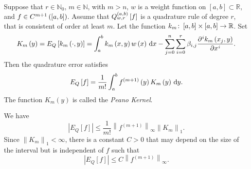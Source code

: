 \begin{frame}
    \begin{theorem}
        Suppose that $r\in\mathbb{N}_{0}$, $m\in\mathbb{N}$, with $m>n$,
        $w$ is a weight function on $\left[a,b\right]\subset\mathbb{R}$, and
        $f\in C^{m+1}\left(\left[a,b\right]\right)$.
        Assume that
        \begin{math}
            Q^{\left(a,b\right)}_{w,r}
            \left[f\right]
        \end{math}
        is a quadrature rule of degree $r$,
        that is consistent of order at least $m$.
        Let the function
        \begin{math}
            k_{m}\colon\left[a,b\right]\times\left[a,b\right]\to\mathbb{R}
        \end{math}.
        Set
        \begin{equation*}
            K_{m}\left(y\right)=
            E_{Q}\left[k_{m}\left(\cdot, y\right)\right]=
            \int_{a}^{b}
            k_{m}\left(x,y\right)w\left(x\right)\dl x-
            \sum_{j=0}^{n}
            \sum_{i=0}^{r}
            \beta_{i,j}
            \diffp[i]{k_{m}\left(x_{j},y\right)}{x}.
        \end{equation*}
        Then the quadrature error satisfies
        \begin{equation*}
            E_{Q}\left[f\right]=
            \dfrac{1}{m!}
            \int_{a}^{b}
            f^{\left(m+1\right)}\left(y\right)
            K_{m}\left(y\right)
            \dl y.
        \end{equation*}
        The function $K_{m}\left(y\right)$ is called the \emph{Peano Kernel}.
    \end{theorem}

    \begin{theorem}
        We have
        \begin{equation*}
            \left|
            E_{Q}
            \left[f\right]
            \right|\leq
            \dfrac{1}{m!}
            {\left\|
                f^{\left(m+1\right)}
                \right\|}_{\infty}
            {\left\|
                K_{m}
                \right\|}_{1}.
        \end{equation*}
        Since ${\left\|K_{m}\right\|}_{1}<\infty$, there is a
        constant $C>0$ that may depend on the size of the interval
        but is independent of $f$ such that
        \begin{equation*}
            \left|
            E_{Q}
            \left[f\right]
            \right|\leq
            C{\left\|
                    f^{\left(m+1\right)}
                    \right\|}_{\infty}.
        \end{equation*}
    \end{theorem}
\end{frame}

